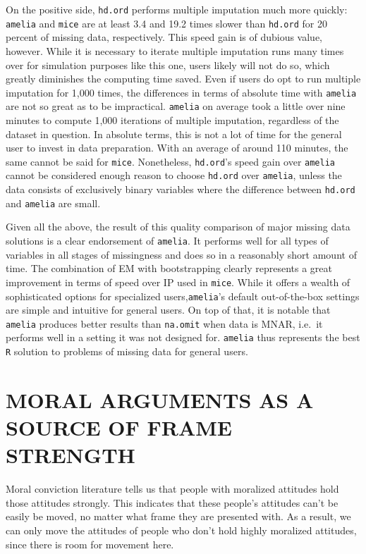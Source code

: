 \documentclass[12pt,econ]{sources/authesis}
\begin{document}
On the positive side, \texttt{hd.ord} performs multiple imputation much more quickly: \texttt{amelia} and \texttt{mice} are at least 3.4 and 19.2 times slower than \texttt{hd.ord} for 20 percent of missing data, respectively. This speed gain is of dubious value, however. While it is necessary to iterate multiple imputation runs many times over for simulation purposes like this one, users likely will not do so, which greatly diminishes the computing time saved. Even if users do opt to run multiple imputation for 1,000 times, the differences in terms of absolute time with \texttt{amelia} are not so great as to be impractical. \texttt{amelia} on average took a little over nine minutes to compute 1,000 iterations of multiple imputation, regardless of the dataset in question. In absolute terms, this is not a lot of time for the general user to invest in data preparation. With an average of around 110 minutes, the same cannot be said for \texttt{mice}. Nonetheless, \texttt{hd.ord}'s speed gain over \texttt{amelia} cannot be considered enough reason to choose \texttt{hd.ord} over \texttt{amelia}, unless the data consists of exclusively binary variables where the difference between \texttt{hd.ord} and \texttt{amelia} are small.

Given all the above, the result of this quality comparison of major missing data solutions is a clear endorsement of \texttt{amelia}. It performs well for all types of variables in all stages of missingness and does so in a reasonably short amount of time. The combination of EM with bootstrapping clearly represents a great improvement in terms of speed over IP used in \texttt{mice}. While it offers a wealth of sophisticated options for specialized users,\texttt{amelia}'s default out-of-the-box settings are simple and intuitive for general users. On top of that, it is notable that \texttt{amelia} produces better results than \texttt{na.omit} when data is MNAR, i.e.~it performs well in a setting it was not designed for. \texttt{amelia} thus represents the best \texttt{R} solution to problems of missing data for general users.

\hypertarget{framing}{%
\chapter{MORAL ARGUMENTS AS A SOURCE OF FRAME STRENGTH}\label{framing}}

Moral conviction literature tells us that people with moralized attitudes hold those attitudes strongly. This indicates that these people's attitudes can't be easily be moved, no matter what frame they are presented with. As a result, we can only move the attitudes of people who don't hold highly moralized attitudes, since there is room for movement here.
\end{document}
